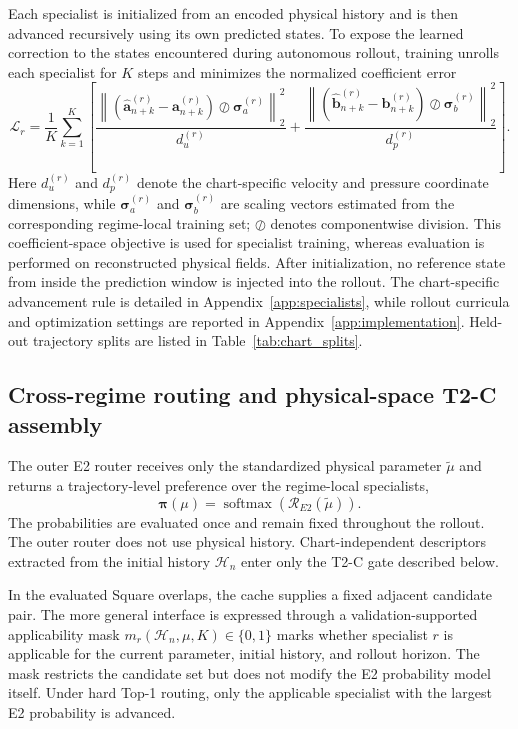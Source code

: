 Each specialist is initialized from an encoded physical history and is then advanced recursively using its own predicted states. To expose the learned correction to the states encountered during autonomous rollout, training unrolls each specialist for $K$ steps and minimizes the
normalized coefficient error
\begin{equation}
  \mathcal L_r=\frac{1}{K}\sum_{k=1}^{K}\left[
  \frac{\left\|(\widehat{\bm a}_{n+k}^{(r)}-\bm a_{n+k}^{(r)})
  \oslash\bm\sigma_a^{(r)}\right\|_2^2}{d_u^{(r)}}
  +\frac{\left\|(\widehat{\bm b}_{n+k}^{(r)}-\bm b_{n+k}^{(r)})
  \oslash\bm\sigma_b^{(r)}\right\|_2^2}{d_p^{(r)}}\right].
  \label{eq:main_rollout_loss}
\end{equation}
Here $d_u^{(r)}$ and $d_p^{(r)}$ denote the chart-specific velocity and pressure coordinate dimensions, while $\bm\sigma_a^{(r)}$ and $\bm\sigma_b^{(r)}$ are scaling
vectors estimated from the corresponding regime-local training set; $\oslash$ denotes componentwise division. This coefficient-space objective is used for specialist training, whereas evaluation is performed on reconstructed physical fields. After initialization, no reference state from inside the prediction window is injected into the rollout. The chart-specific advancement rule is detailed in Appendix~\ref{app:specialists}, while rollout curricula and optimization settings are reported in Appendix~\ref{app:implementation}. Held-out trajectory splits are listed in Table~\ref{tab:chart_splits}.



\subsection{Cross-regime routing and physical-space T2-C assembly}

The outer E2 router receives only the standardized physical parameter $\widetilde\mu$ and returns a trajectory-level preference over the
regime-local specialists,
\[
\bm\pi(\mu)
=
\operatorname{softmax}\!\left(
\mathcal R_{E2}(\widetilde\mu)
\right).
\]
The probabilities are evaluated once and remain fixed throughout the rollout. The outer router does not use physical history. Chart-independent descriptors extracted from the initial history $\mathcal H_n$ enter only the T2-C gate described below.

In the evaluated Square overlaps, the cache supplies a fixed adjacent candidate pair. The more general interface is expressed through a validation-supported applicability mask $m_r(\mathcal H_n,\mu,K)\in\{0,1\}$ marks whether specialist $r$ is applicable for the current parameter, initial history, and rollout horizon. The mask restricts the candidate set but does not modify the E2 probability
model itself. Under hard Top-1 routing, only the applicable specialist with the largest E2 probability is advanced.

